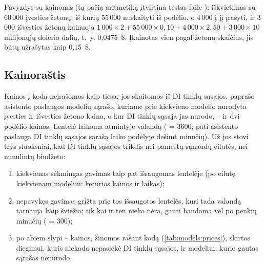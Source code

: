 Pavyzdys su  kainomis (tą pačią aritmetiką įtvirtina testas faile
): iškvietimas su 60\,000 įvesties žetonų, iš kurių 55\,000
nuskaityti iš podėlio, o 4\,000 į jį įrašyti, ir 3\,000 išvesties žetonų kainuoja
$1\,000 \times 2 + 55\,000 \times 0{,}10 + 4\,000 \times 2{,}50 + 3\,000 \times 10$ milijonųjų
dolerio dalių, t.~y. 0,0475~\$. Įkainotas vien pagal žetonų skaičius, jis būtų užrašytas kaip
0,15~\$.

\subsection{Kainoraštis}

Kainos į kodą neįrašomos kaip tiesa; jos skaitomos iš DI tinklų sąsajos. 
paprašo asistento paslaugos modelių sąrašo, kuriame prie kiekvieno modelio nurodyta įvesties ir
išvesties žetono kaina, o kur DI tinklų sąsaja jas nurodo, -- ir dvi podėlio kainos. Lentelė
laikoma atmintyje valandą ( = 3600; pati asistento paslauga DI tinklų sąsajos
sąrašą laiko podėlyje dešimt minučių). Už jos stovi trys sluoksniai, kad DI tinklų sąsajos
trikdis nei pamestų sąnaudų eilutės, nei nunulintų biudžeto:

\begin{enumerate}
  \item kiekvienas sėkmingas gavimas taip pat išsaugomas lentelėje  (po
    eilutę kiekvienam modeliui: keturios kainos ir laikas);
  \item nepavykęs gavimas grįžta prie tos išsaugotos lentelės, kuri tada valandą tarnauja kaip
    šviežia; tik kai ir ten nieko nėra, gauti bandoma vėl po penkių minučių
    ( = 300);
  \item po abiem slypi  -- kainos, žinomos rašant kodą
    (\cref{tab:models:prices}), skirtos diegimui, kuris niekada nepasiekė DI tinklų sąsajos,
    ir modeliui, kurio gautas sąrašas nenurodo.
\end{enumerate}

